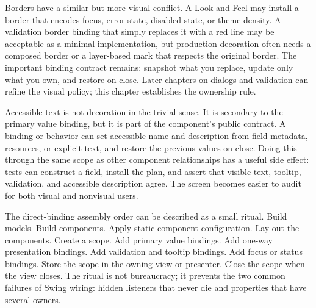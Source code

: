 Borders have a similar but more visual conflict. A Look-and-Feel may install a
border that encodes focus, error state, disabled state, or theme density. A
validation border binding that simply replaces it with a red line may be
acceptable as a minimal implementation, but production decoration often needs a
composed border or a layer-based mark that respects the original border. The
important binding contract remains: snapshot what you replace, update only what
you own, and restore on close. Later chapters on dialogs and validation can
refine the visual policy; this chapter establishes the ownership rule.

Accessible text is not decoration in the trivial sense. It is secondary to the
primary value binding, but it is part of the component's public contract. A
binding or behavior can set accessible name and description from field
metadata, resources, or explicit text, and restore the previous values on
close. Doing this through the same scope as other component relationships has a
useful side effect: tests can construct a field, install the plan, and assert
that visible text, tooltip, validation, and accessible description agree. The
screen becomes easier to audit for both visual and nonvisual users.

The direct-binding assembly order can be described as a small ritual. Build
models. Build components. Apply static component configuration. Lay out the
components. Create a scope. Add primary value bindings. Add one-way
presentation bindings. Add validation and tooltip bindings. Add focus or status
bindings. Store the scope in the owning view or presenter. Close the scope when
the view closes. The ritual is not bureaucracy; it prevents the two common
failures of Swing wiring: hidden listeners that never die and properties that
have several owners.

